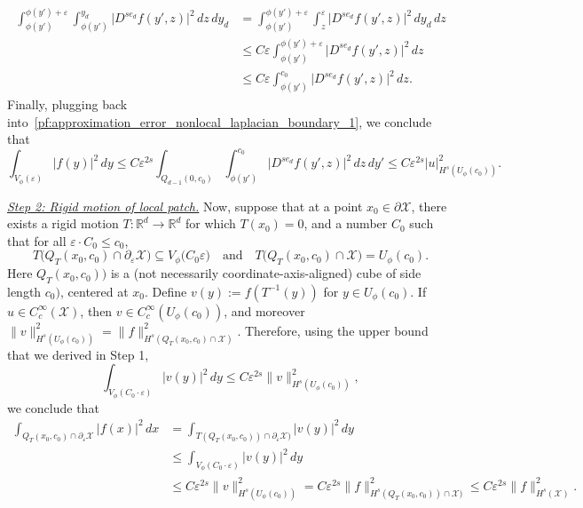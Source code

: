 \documentclass[aos]{imsart}
\theoremstyle{plain}
\theoremstyle{definition}
\theoremstyle{remark}
\def\R{\mathbb{R}}
\newcommand{\mc}[1]{\mathcal{#1}}
\newcommand{\Reals}{\mathbb{R}} %
\newcommand{\Rd}{\Reals^d}
\newcommand{\1}{\mathbf{1}}
\begin{document}
\begin{align*}
\int_{\phi(y')}^{\phi(y') + \varepsilon} \int_{\phi(y')}^{y_d} \bigl|D^{se_d}f(y',z)\bigr|^2 \,dz \,dy_d & = \int_{\phi(y')}^{\phi(y') + \varepsilon} \int_{z}^{\varepsilon} \bigl|D^{se_d}f(y',z)\bigr|^2 \,dy_d \,dz \\
& \leq C \varepsilon \int_{\phi(y')}^{\phi(y') + \varepsilon} \bigl|D^{se_d}f(y',z)\bigr|^2 \,dz \\
& \leq C \varepsilon \int_{\phi(y')}^{c_0} \bigl|D^{se_d}f(y',z)\bigr|^2 \,dz.
\end{align*}
Finally, plugging back into~\eqref{pf:approximation_error_nonlocal_laplacian_boundary_1}, we conclude that
\begin{equation*}
\int_{V_{\phi}(\varepsilon)} |f(y)|^2 \,dy \leq C \varepsilon^{2s} \int_{Q_{d - 1}(0,c_0)} \int_{\phi(y')}^{c_0} \bigl|D^{se_d}f(y',z)\bigr|^2 \,dz \,dy' \leq C \varepsilon^{2s} |u|_{H^s(U_{\phi}(c_0))}^2.
\end{equation*}

\underline{\textit{Step 2: Rigid motion of local patch.}} Now, suppose that at a point $x_0 \in \partial \mc{X}$, there exists a rigid motion $T: \Rd \to \Rd$ for which $T(x_0) = 0$, and a number $C_0$ such that for all $\varepsilon \cdot C_0 \leq c_0$, 
\begin{equation*}
T\bigl(Q_{T}(x_0,c_0) \cap \partial_{\varepsilon}\mc{X}\bigr) \subseteq V_{\phi}\bigl(C_0\varepsilon\bigr) \quad\textrm{and}\quad T\bigl(Q_T(x_0,c_0) \cap \mc{X}\bigr) = U_{\phi}(c_0).
\end{equation*}
Here $Q_{T}(x_0,c_0))$ is a (not necessarily coordinate-axis-aligned) cube of side length $c_0)$, centered at $x_0$. Define $v(y) := f(T^{-1}(y))$ for $y \in U_{\phi}(c_0)$. If $u \in C_c^{\infty}(\mc{X})$, then $v \in C_c^{\infty}(U_{\phi}(c_0))$, and moreover $\|v\|_{H^s(U_{\phi}(c_0))}^2 = \|f\|_{H^s(Q_{T}(x_0,c_0) \cap \mc{X})}^2$. Therefore, using the upper bound that we derived in Step 1,
\begin{equation*}
\int_{V_{\phi}(C_0 \cdot \varepsilon)} |v(y)|^2 \,dy \leq C \varepsilon^{2s} \|v\|_{H^s(U_{\phi}(c_0))}^2,
\end{equation*}
we conclude that
\begin{align*}
\int_{Q_{T}(x_0,c_0) \cap \partial_{\varepsilon}\mc{X}} |f(x)|^2 \,dx & = \int_{T(Q_T(x_0,c_0)) \cap \partial_{\varepsilon}\mc{X})} |v(y)|^2 \,dy \\
& \leq \int_{V_{\phi}(C_0 \cdot \varepsilon)} |v(y)|^2 \,dy \\
& \leq C \varepsilon^{2s} \|v\|_{H^s(U_{\phi}(c_0))}^2 = C \varepsilon^{2s} \|f\|_{H^s(Q_{T}(x_0,c_0)) \cap \mc{X})}^2 \leq C \varepsilon^{2s} \|f\|_{H^s(\mc{X})}^2.
\end{align*}
\end{document}
